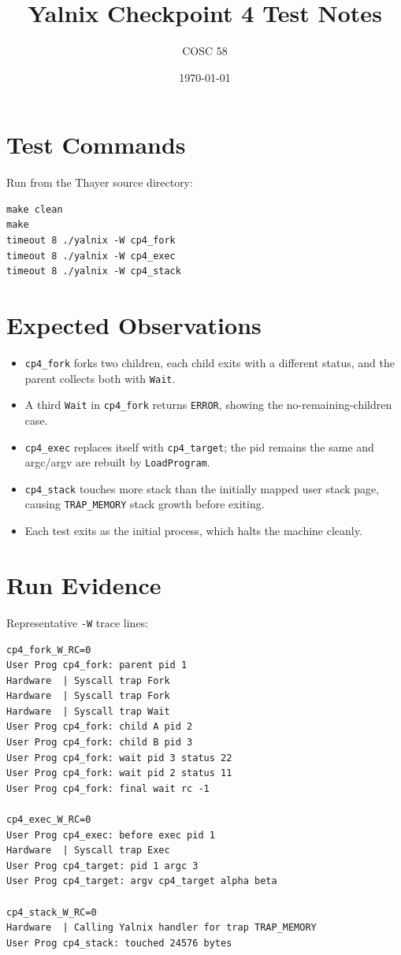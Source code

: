 \documentclass[11pt]{article}
\title{Yalnix Checkpoint 4 Test Notes}
\author{COSC 58}
\date{\today}
\begin{document}
\maketitle

\section{Test Commands}

Run from the Thayer source directory:

\begin{lstlisting}[style=shell]
make clean
make
timeout 8 ./yalnix -W cp4_fork
timeout 8 ./yalnix -W cp4_exec
timeout 8 ./yalnix -W cp4_stack
\end{lstlisting}

\section{Expected Observations}

\begin{itemize}[noitemsep]
  \item \texttt{cp4\_fork} forks two children, each child exits with a different status, and the parent collects both with \texttt{Wait}.
  \item A third \texttt{Wait} in \texttt{cp4\_fork} returns \texttt{ERROR}, showing the no-remaining-children case.
  \item \texttt{cp4\_exec} replaces itself with \texttt{cp4\_target}; the pid remains the same and argc/argv are rebuilt by \texttt{LoadProgram}.
  \item \texttt{cp4\_stack} touches more stack than the initially mapped user stack page, causing \texttt{TRAP\_MEMORY} stack growth before exiting.
  \item Each test exits as the initial process, which halts the machine cleanly.
\end{itemize}

\section{Run Evidence}

Representative \texttt{-W} trace lines:

\begin{lstlisting}[style=shell]
cp4_fork_W_RC=0
User Prog cp4_fork: parent pid 1
Hardware  | Syscall trap Fork
Hardware  | Syscall trap Fork
Hardware  | Syscall trap Wait
User Prog cp4_fork: child A pid 2
User Prog cp4_fork: child B pid 3
User Prog cp4_fork: wait pid 3 status 22
User Prog cp4_fork: wait pid 2 status 11
User Prog cp4_fork: final wait rc -1

cp4_exec_W_RC=0
User Prog cp4_exec: before exec pid 1
Hardware  | Syscall trap Exec
User Prog cp4_target: pid 1 argc 3
User Prog cp4_target: argv cp4_target alpha beta

cp4_stack_W_RC=0
Hardware  | Calling Yalnix handler for trap TRAP_MEMORY
User Prog cp4_stack: touched 24576 bytes
\end{lstlisting}
\end{document}
